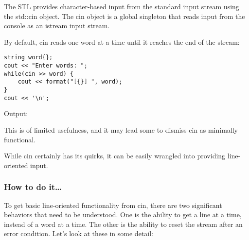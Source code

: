 
The STL provides character-based input from the standard input stream using the std::cin object. The cin object is a global singleton that reads input from the console as an istream input stream.

By default, cin reads one word at a time until it reaches the end of the stream:

\begin{lstlisting}[style=styleCXX]
string word{};
cout << "Enter words: ";
while(cin >> word) {
	cout << format("[{}] ", word);
}
cout << '\n';
\end{lstlisting}

Output:


This is of limited usefulness, and it may lead some to dismiss cin as minimally functional.

While cin certainly has its quirks, it can be easily wrangled into providing line-oriented input.

\subsubsection{How to do it…}

To get basic line-oriented functionality from cin, there are two significant behaviors that need to be understood. One is the ability to get a line at a time, instead of a word at a time. The other is the ability to reset the stream after an error condition. Let's look at these in some detail:

